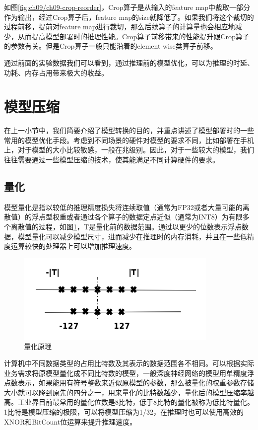 如图\ref{fig:ch09/ch09-crop-reorder}，Crop算子是从输入的feature map中裁取一部分作为输出，经过Crop算子后，feature map的size就降低了。如果我们将这个裁切的过程前移，提前对feature map进行裁切，那么后续算子的计算量也会相应地减少，从而提高模型部署时的推理性能。Crop算子前移带来的性能提升跟Crop算子的参数有关。但是Crop算子一般只能沿着的element wise类算子前移。

通过前面的实验数据我们可以看到，通过推理前的模型优化，可以为推理的时延、功耗、内存占用带来极大的收益。


\section{模型压缩}\label{sec:ch09/ch09-model-compression}
在上一小节中，我们简要介绍了模型转换的目的，并重点讲述了模型部署时的一些常用的模型优化手段。考虑到不同场景的硬件对模型的要求不同，比如部署在手机上，对于模型的大小比较敏感，一般在兆级别。因此，对于一些较大的模型，我们往往需要通过一些模型压缩的技术，使其能满足不同计算硬件的要求。

\subsection{量化}
模型量化是指以较低的推理精度损失将连续取值（通常为FP32或者大量可能的离散值）的浮点型权重或者通过各个算子的数据定点近似（通常为INT8）为有限多个离散值的过程，如图\ref{fig:ch09/ch09-quant-minmax}，T是量化前的数据范围。通过以更少的位数表示浮点数据，模型量化可以减少模型尺寸，进而减少在推理时的内存消耗，并且在一些低精度运算较快的处理器上可以增加推理速度。

\begin{figure}[h]
\centering
\includegraphics[scale=0.6]{figs/ch09/ch09-quant-minmax.png}
\caption{量化原理}
\label{fig:ch09/ch09-quant-minmax}
\end{figure}

计算机中不同数据类型的占用比特数及其表示的数据范围各不相同。可以根据实际业务需求将原模型量化成不同比特数的模型，一般深度神经网络的模型用单精度浮点数表示，如果能用有符号整数来近似原模型的参数，那么被量化的权重参数存储大小就可以降到原先的四分之一，用来量化的比特数越少，量化后的模型压缩率越高。工业界目前最常用的量化位数是8比特，低于8比特的量化被称为低比特量化。1比特是模型压缩的极限，可以将模型压缩为1/32，在推理时也可以使用高效的XNOR和BitCount位运算来提升推理速度。

